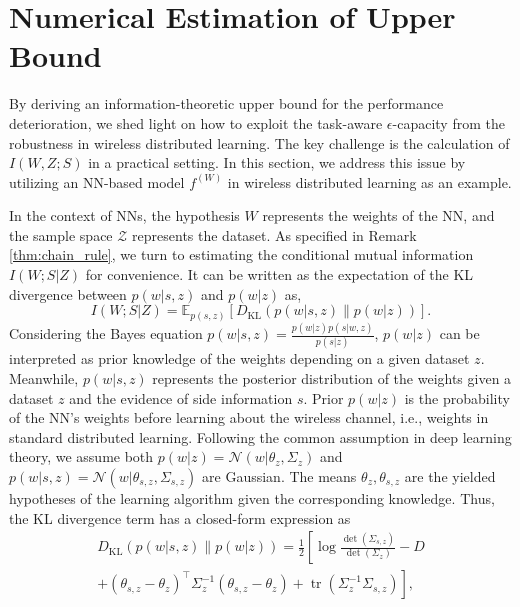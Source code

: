 \documentclass[lettersize,journal]{IEEEtran}
\newcommand{\E}{\mathbb{E}}
\theoremstyle{definition}
\theoremstyle{plain}
\begin{document}
\section{Numerical Estimation of Upper Bound}
\label{sec:numerical_example}
By deriving an information-theoretic upper bound for the performance deterioration, we shed light on how to exploit the task-aware $\epsilon$-capacity from the robustness in wireless distributed learning.
The key challenge is the calculation of $I(W,Z;S)$ in a practical setting. In this section, we address this issue by utilizing an NN-based model $f^{(W)}$ in wireless distributed learning as an example.

In the context of NNs, the hypothesis $W$ represents the weights of the NN, and the sample space $\mathcal{Z}$ represents the dataset.
As specified in Remark \ref{thm:chain_rule}, we turn to estimating the conditional mutual information $I(W;S|Z)$ for convenience. It can be written as the expectation of the KL divergence between $p(w|s,z)$ and $p(w|z)$ as, 
\begin{equation}
    \label{equ:KL_divergence_conditional}
    I(W ; S | Z) = \E_{p(s,z)}\left[D_{\text{KL}}(p(w | s, z) \| p(w | z))\right].
\end{equation}
Considering the Bayes equation $p(w|s,z)=\frac{p(w|z)p(s|w,z)}{p(s|z)}$, $p(w|z)$ can be interpreted as prior knowledge of the weights depending on a given dataset $z$. Meanwhile, $p(w|s,z)$ represents the posterior distribution of the weights given a dataset $z$ and the evidence of side information $s$. Prior $p(w|z)$ is the probability of the NN's weights before learning about the wireless channel, i.e., weights in standard distributed learning.
Following the common assumption in deep learning theory, we assume both $p(w|z)=\mathcal{N}(w|\theta_z,\Sigma_z)$ and $p(w|s,z)=\mathcal{N}(w|\theta_{s,z},\Sigma_{s,z})$ are Gaussian. The means $\theta_{z}, \theta_{s,z}$ are the yielded hypotheses of the learning algorithm given the corresponding knowledge. Thus, the KL divergence term has a closed-form expression as
\begin{equation}
    \label{equ:KL_divergence_Gaussian}
    \begin{split}
        D_{\text{KL}}(p(w | s, z) \| p(w | z)) = \frac{1}{2}\left[\log \frac{\det \left(\Sigma_{s,z}\right)}{\det \left(\Sigma_z\right)}-D\right.\\
        \left.+\left(\theta_{s,z}-\theta_z\right)^{\top} \Sigma_z^{-1}\left(\theta_{s,z}-\theta_z\right)+\operatorname{tr}\left(\Sigma_z^{-1} \Sigma_{s,z}\right)\right],
    \end{split}
\end{equation}
\end{document}
